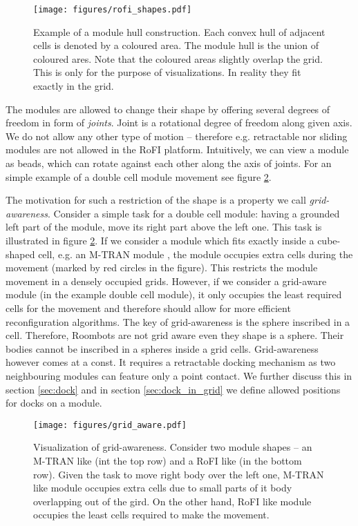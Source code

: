 \begin{figure}[!ht]
    \centering
    \texttt{[image: figures/rofi\_shapes.pdf]}
    \caption{Example of a module hull construction. Each convex hull of adjacent
    cells is denoted by a coloured area. The module hull is the union of coloured
    ares. Note that the coloured areas slightly overlap the grid. This is only
    for the purpose of visualizations. In reality they fit exactly in the grid.}
    \label{fig:rofi_shapes}
\end{figure}

The modules are allowed to change their shape by offering several degrees of
freedom in form of \emph{joints}. Joint is a rotational degree of freedom along
given axis. We do not allow any other type of motion -- therefore e.g.
retractable nor sliding modules are not allowed in the RoFI platform.
Intuitively, we can view a module as beads, which can rotate against each other
along the axis of joints. For an simple example of a double cell module movement
see figure \ref{fig:grid_aware}.

The motivation for such a restriction of the shape is a property we call
\emph{grid-awareness}. Consider a simple task for a double cell module: having a
grounded left part of the module, move its right part above the left one. This
task is illustrated in figure \ref{fig:grid_aware}. If we consider a module
which fits exactly inside a cube-shaped cell, e.g. an M-TRAN module
\cite{haruhisa_kurokawa_m-tran_2003}, the module occupies extra cells during the
movement (marked by red circles in the figure). This restricts the module
movement in a densely occupied grids. However, if we consider a grid-aware
module (in the example double cell module), it only occupies the least required
cells for the movement and therefore should allow for more efficient
reconfiguration algorithms. The key of grid-awareness is the sphere inscribed in
a cell. Therefore, Roombots\cite{bonardi_locomotion_2012} are not grid aware
even they shape is a sphere. Their bodies cannot be inscribed in a spheres
inside a grid cells. Grid-awareness however comes at a const. It requires a
retractable docking mechanism as two neighbouring modules can feature only a
point contact. We further discuss this in section \ref{sec:dock} and in section
\ref{sec:dock_in_grid} we define allowed positions for docks on a module.

\begin{figure}[!ht]
    \centering
    \texttt{[image: figures/grid\_aware.pdf]}
    \caption{Visualization of grid-awareness. Consider two module shapes -- an
    M-TRAN\cite{haruhisa_kurokawa_m-tran_2003} like (int the top row) and a RoFI
    like (in the bottom row). Given the task to move right body over the left
    one, M-TRAN like module occupies extra cells due to small parts of it body
    overlapping out of the gird. On the other hand, RoFI like module occupies
    the least cells required to make the movement. }
    \label{fig:grid_aware}
\end{figure}

